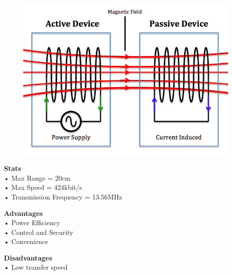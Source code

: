 \documentclass[a0paper,portrait]{baposter}
\begin{document}
\begin{poster}
{\begin{figure}
	{\includegraphics[scale=0.195]{NFC_Diagram}}
\end{figure}

\textbf{Stats}\\
• Max Range = 20cm\\ 
• Max Speed = 424kbit/s\\
• Transmission Frequency = 13.56MHz

\textbf{Advantages}\\
• Power Efficiency\\
• Control and Security\\
• Convenience

\textbf{Disadvantages}\\
• Low transfer speed

}


\end{poster}
\end{document}
